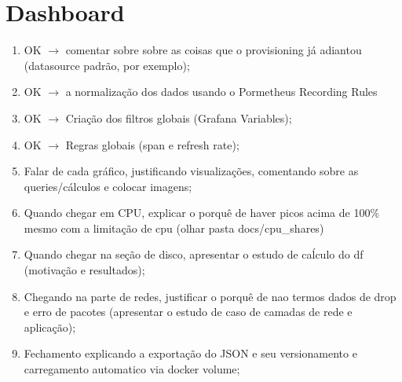 

{\color{blue}
\section{Dashboard}

\begin{enumerate}  
  \item OK $\rightarrow$ comentar sobre sobre as coisas que o provisioning já adiantou (datasource padrão, por exemplo);
  \item OK $\rightarrow$ a normalização dos dados usando o Pormetheus Recording Rules
  \item OK $\rightarrow$ Criação dos filtros globais (Grafana Variables);
  \item OK $\rightarrow$ Regras globais (span e refresh rate);
  \item Falar de cada gráfico, justificando visualizações, comentando sobre as queries/cálculos e colocar imagens;
  \item Quando chegar em CPU, explicar o porquê de haver picos acima de 100\% mesmo com a limitação de cpu (olhar pasta docs/cpu\_shares)
  \item Quando chegar na seção de disco, apresentar o estudo de caĺculo do df (motivação e resultados);
  \item Chegando na parte de redes, justificar o porquê de nao termos dados de drop e erro de pacotes (apresentar o estudo de caso de camadas de rede e aplicação);
  \item Fechamento explicando a exportação do JSON e seu versionamento e carregamento automatico via docker volume;
\end{enumerate}


}
